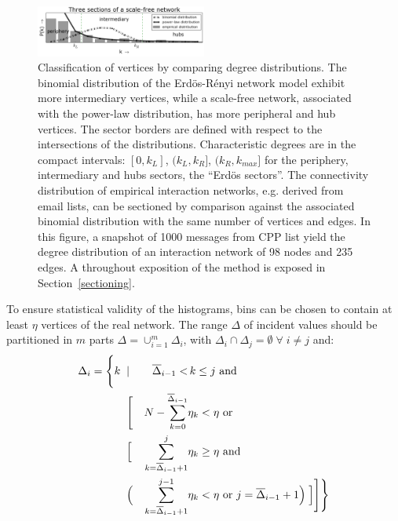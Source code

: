 \documentclass[%
	aip,
	jmp,%
	amsmath,amssymb,
	reprint,%
]{revtex4-1}
\begin{document}
\begin{figure}[!h]
	\centering
	\includegraphics[width=0.5\textwidth]{figs/fser__}
	\caption{Classification of vertices by comparing degree
		distributions.
		The binomial distribution of the Erd\"os-R\'enyi network model exhibit more intermediary vertices,
		while a scale-free network, associated with the power-law distribution,
		has more peripheral and hub vertices.
		The sector borders are defined with respect to the intersections of the distributions.
Characteristic degrees are in the compact intervals: $[0,k_L]$, $(k_L,k_R]$, $(k_R,k_{max}]$ for the periphery,
intermediary and hubs sectors, the ``Erd\"os sectors''.
		The connectivity distribution of empirical interaction networks, e.g. derived from email lists,
		can be sectioned by comparison against the associated binomial distribution with the same number of vertices and edges.
		In this figure, a snapshot of 1000 messages from CPP list yield the degree distribution
		of an interaction network of 98 nodes and 235 edges.
		A throughout exposition of the method is exposed in Section~\ref{sectioning}.}
		\label{fig:setores}
\end{figure}
To ensure statistical validity of the histograms, bins can be chosen to contain at least $\eta$ vertices of the real network.
The range $\Delta$ of incident values should be partitioned in $m$ parts $\Delta=\cup_{i=1}^m \Delta_i$,
with $\Delta_i\cap \Delta_j=\emptyset \; \forall\; i \neq j$ and:
\begin{align}
\Delta_i =\Biggl\{ k\;\; & | & \overline{\Delta}_{i-1}< &\, k\leq j \text{ and }\;\;\;\;\;\;\;\;\;\;\;\;\nonumber\\
		      & \Biggl[ & N - \sum_{k=0}^{\overline{\Delta}_{i-1}} & \eta_k< \eta \text{ or }\\
&	\Bigl[ & \sum_{k=\overline{\Delta}_{i-1}+1}^j &  \eta_k \geq \eta \text{ and }\;\;\;\;\;\;\nonumber\\
& \Bigl( &\sum_{k=\overline{\Delta}_{i-1}+1}^{j-1} &  \eta_k < \eta \text{ or }   j=\overline{\Delta}_{i-1}+1 \Bigr) \;\Bigr] \Biggr] \Biggr\}\nonumber
\end{align}
	
\end{document}
